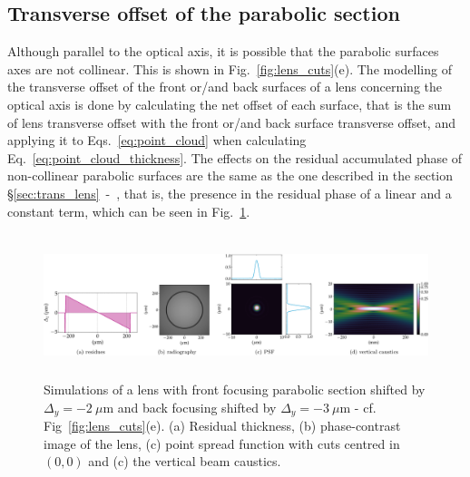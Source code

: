 \begin{refsection}
\subsection{Transverse offset of the parabolic section}

Although parallel to the optical axis, it is possible that the parabolic surfaces axes are not collinear. This is shown in Fig.~\ref{fig:lens_cuts}(e). The modelling of the transverse offset of the front or/and back surfaces of a lens concerning the optical axis is done by calculating the net offset of each surface, that is the sum of lens transverse offset with the front or/and back surface transverse offset, and applying it to Eqs.~\ref{eq:point_cloud} when calculating Eq.~\ref{eq:point_cloud_thickness}. The effects on the residual accumulated phase of non-collinear parabolic surfaces are the same as the one described in the section \S\ref{sec:trans_lens}~-~\textit{}, that is, the presence in the residual phase of a linear and a constant term, which can be seen in Fig.~\ref{fig:offset_fs_CRL}.


\begin{figure}[t]
        \centering
        \includegraphics[height=4.19cm]{figures/compressed/offset_fs_CRL.pdf}
        \caption[Effects of the transverse offset of the parabolic section]{Simulations of a lens with front focusing parabolic section shifted by $\Delta_y=-2~\mu$m and back focusing shifted by $\Delta_y=-3~\mu$m - cf. Fig~\ref{fig:lens_cuts}(e). (a) Residual thickness, (b) phase-contrast image of the lens, (c) point spread function with cuts centred in $(0,0)$ and (c) the vertical beam caustics.} \label{fig:offset_fs_CRL}
\end{figure}


\end{refsection}

